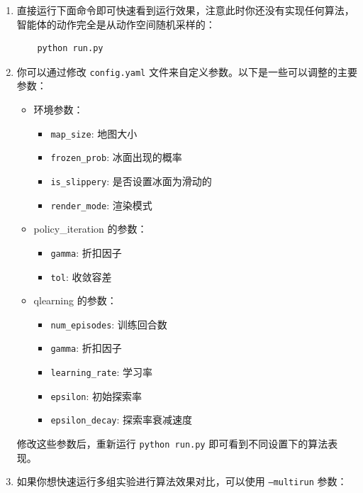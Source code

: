 \documentclass[a4paper,12pt]{article}
\begin{document}
\begin{enumerate}
    \item 直接运行下面命令即可快速看到运行效果，注意此时你还没有实现任何算法，智能体的动作完全是从动作空间随机采样的：
    \begin{verbatim}
    python run.py
    \end{verbatim}
    \item 你可以通过修改 \texttt{config.yaml} 文件来自定义参数。以下是一些可以调整的主要参数：
    \begin{itemize}
        \item 环境参数：
        \begin{itemize}
            \item \texttt{map_size}: 地图大小
            \item \texttt{frozen_prob}: 冰面出现的概率
            \item \texttt{is_slippery}: 是否设置冰面为滑动的
            \item \texttt{render_mode}: 渲染模式
        \end{itemize}
        \item policy\_iteration 的参数：
        \begin{itemize}
            \item \texttt{gamma}: 折扣因子
            \item \texttt{tol}: 收敛容差
        \end{itemize}
        \item qlearning 的参数：
        \begin{itemize}
            \item \texttt{num_episodes}: 训练回合数
            \item \texttt{gamma}: 折扣因子
            \item \texttt{learning_rate}: 学习率
            \item \texttt{epsilon}: 初始探索率
            \item \texttt{epsilon_decay}: 探索率衰减速度
        \end{itemize}
    \end{itemize}
    修改这些参数后，重新运行 \texttt{python run.py} 即可看到不同设置下的算法表现。
    \item 如果你想快速运行多组实验进行算法效果对比，可以使用 \texttt{--multirun} 参数：
    \begin{verbatim}

\end{verbatim}
\end{enumerate}
\end{document}

